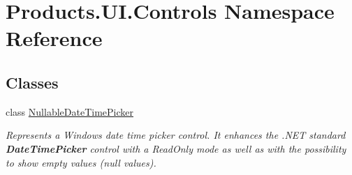 \hypertarget{namespace_products_1_1_u_i_1_1_controls}{}\section{Products.\+U\+I.\+Controls Namespace Reference}
\label{namespace_products_1_1_u_i_1_1_controls}
\subsection*{Classes}
\begin{DoxyCompactItemize}
\item 
class \hyperlink{class_products_1_1_u_i_1_1_controls_1_1_nullable_date_time_picker}{Nullable\+Date\+Time\+Picker}
\begin{DoxyCompactList}\small\item\em Represents a Windows date time picker control. It enhances the .N\+ET standard {\bfseries Date\+Time\+Picker} control with a Read\+Only mode as well as with the possibility to show empty values (null values). \end{DoxyCompactList}\end{DoxyCompactItemize}
